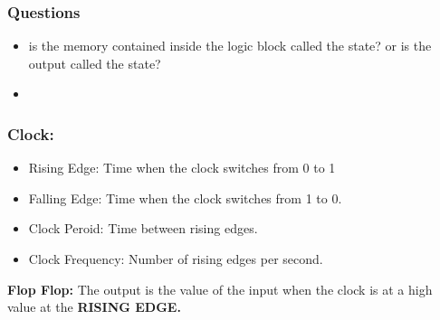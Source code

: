 \documentclass[12pt]{article}
\begin{document}
\subsubsection*{Questions}
\begin{itemize}
    \item is the memory contained inside the logic block called the state? or is the output called the state?
    \item
\end{itemize}


\subsubsection*{Clock:}
\begin{itemize}
    \item Rising Edge: Time when the clock switches from 0 to 1
    \item Falling Edge: Time when the clock switches from 1 to 0.
    \item Clock Peroid: Time between rising edges.
    \item Clock Frequency: Number of rising edges per second.
\end{itemize}

\textbf{Flop Flop:}
The output is the value of the input when the clock is at a high value at the \textbf{RISING EDGE.}
\end{document}
